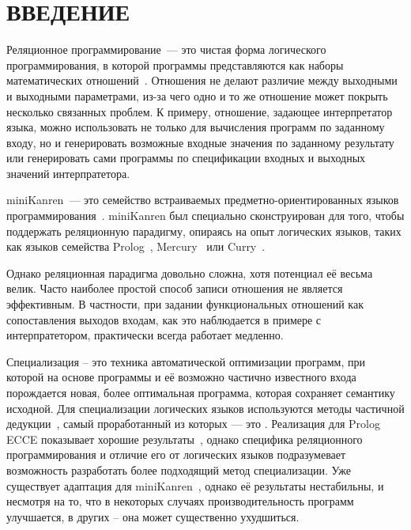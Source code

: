 \section*{ВВЕДЕНИЕ}


Реляционное программирование~--- это чистая форма логического программирования,
в которой программы представляются как наборы математических отношений~\cite{byrdMK}.
Отношения
не делают различие между выходными и выходными параметрами, из-за чего одно и то же
отношение может покрыть несколько связанных проблем. К примеру, отношение, задающее
интерпретатор языка, можно использовать не только для вычисления программ по
заданному входу, но и генерировать возможные входные значения по заданному результату
или генерировать сами программы по спецификации входных и выходных значений интерпратетора.

miniKanren~--- это семейство встраиваемых предметно-ориентированных языков программирования~\cite{byrdMK}.
miniKanren был специально сконструирован для того, чтобы поддержать реляционную парадигму,
опираясь на опыт логических языков, таких как языков семейства Prolog~\cite{logicMJ},
Mercury~\cite{mercury} или Curry~\cite{curry}.

Однако реляционная парадигма довольно сложна, хотя потенциал её весьма велик.
Часто наиболее простой способ записи отношения не является эффективным. В
частности, при задании функциональных отношений как сопоставления выходов
входам, как это наблюдается в примере с интерпратетором, практически
всегда работает медленно.

Специализация -- это техника автоматической оптимизации программ,
при которой на основе программы и её возможно частично известного входа
порождается новая, более оптимальная программа, которая сохраняет семантику
исходной. Для специализации логических языков используются методы частичной дедукции~\cite{advanced},
самый проработанный из которых --- это \cpd\cite{cpd}. Реализация \cpd для Prolog ECCE показывает
хорошие результаты~\cite{controlPoly}, однако специфика реляционного программирования
и отличие его от логических языков подразумевает возможность разработать более подходящий
метод специализации. Уже существует адаптация \cpd для miniKanren~\cite{lozov},
однако её результаты нестабильны, и несмотря на то, что в некоторых случаях
производительность программ улучшается, в других -- она может существенно ухудшиться.

